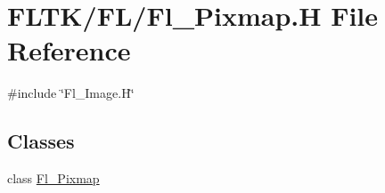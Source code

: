 \hypertarget{_fl___pixmap_8_h}{}\section{F\+L\+T\+K/\+F\+L/\+Fl\+\_\+\+Pixmap.H File Reference}
\label{_fl___pixmap_8_h}
{\ttfamily \#include \char`\"{}Fl\+\_\+\+Image.\+H\char`\"{}}\newline
\subsection*{Classes}
\begin{DoxyCompactItemize}
\item 
class \hyperlink{class_fl___pixmap}{Fl\+\_\+\+Pixmap}
\end{DoxyCompactItemize}
